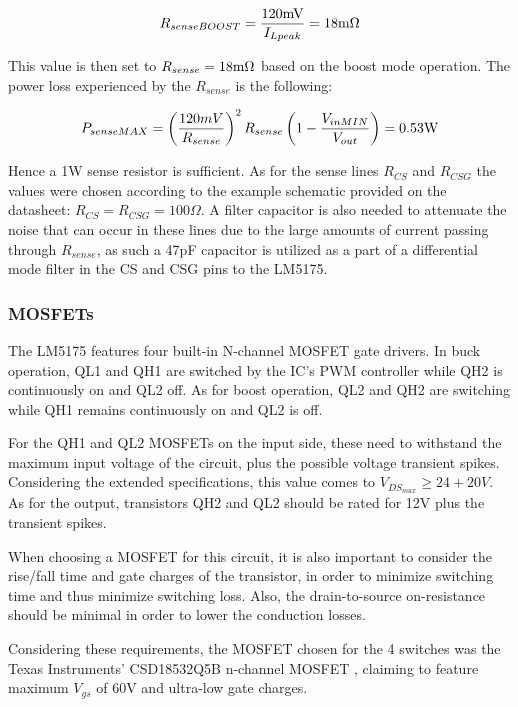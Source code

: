\documentclass[11pt, a4paper]{article}
\begin{document}
\begin{equation}
    R_{senseBOOST} = \frac{120\text{mV}}{I_{Lpeak}} = 18\text m\Omega
\end{equation}

This value is then set to $R_{sense} = 18\text m\Omega$ based on the boost mode operation. The power loss experienced by the $R_{sense}$ is the following:

\begin{equation}
    P_{senseMAX} = \left (\frac{120mV}{R_{sense}}\right )^2R_{sense}\left (1-\frac{V_{inMIN}}{V_{out}}\right ) = 0.53 \text W
    \label{eq:rsensePower}
\end{equation}

Hence a 1W sense resistor is sufficient. As for the sense lines $R_{CS}$ and $R_{CSG}$ the values were chosen according to the example schematic provided on the datasheet: $R_{CS} = R_{CSG} = 100\Omega$. A filter capacitor is also needed to attenuate the noise that can occur in these lines due to the large amounts of current passing through $R_{sense}$, as such a 47pF capacitor is utilized as a part of a differential mode filter in the CS and CSG pins to the LM5175.

\subsubsection{MOSFETs}

The LM5175 features four built-in N-channel MOSFET gate drivers. In buck operation, QL1 and QH1 are switched by the IC's PWM controller while QH2 is continuously on and QL2 off. As for boost operation, QL2 and QH2 are switching while QH1 remains continuously on and QL2 is off.

For the QH1 and QL2 MOSFETs on the input side, these need to withstand the maximum input voltage of the circuit, plus the possible voltage transient spikes. Considering the extended specifications, this value comes to $V_{DS_{max}} \ge 24 + 20V$. As for the output, transistors QH2 and QL2 should be rated for 12V plus the transient spikes.

When choosing a MOSFET for this circuit, it is also important to consider the rise/fall time and gate charges of the transistor, in order to minimize switching time and thus minimize switching loss. Also, the drain-to-source on-resistance should be minimal in order to lower the conduction losses.

Considering these requirements, the MOSFET chosen for the 4 switches was the Texas Instruments' CSD18532Q5B n-channel MOSFET \cite{CSD18532data}, claiming to feature maximum $V_{gs}$ of 60V and ultra-low gate charges.
\end{document}
